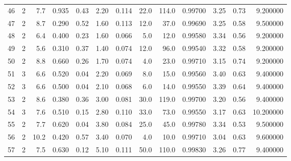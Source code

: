 \begin{tabular}{lrrrrrrrrrrrr}
46   &        2 &            7.7 &             0.935 &         0.43 &            2.20 &      0.114 &                 22.0 &                 114.0 &  0.99700 &  3.25 &       0.73 &   9.200000 \\
47   &        2 &            8.7 &             0.290 &         0.52 &            1.60 &      0.113 &                 12.0 &                  37.0 &  0.99690 &  3.25 &       0.58 &   9.500000 \\
48   &        2 &            6.4 &             0.400 &         0.23 &            1.60 &      0.066 &                  5.0 &                  12.0 &  0.99580 &  3.34 &       0.56 &   9.200000 \\
49   &        2 &            5.6 &             0.310 &         0.37 &            1.40 &      0.074 &                 12.0 &                  96.0 &  0.99540 &  3.32 &       0.58 &   9.200000 \\
50   &        2 &            8.8 &             0.660 &         0.26 &            1.70 &      0.074 &                  4.0 &                  23.0 &  0.99710 &  3.15 &       0.74 &   9.200000 \\
51   &        3 &            6.6 &             0.520 &         0.04 &            2.20 &      0.069 &                  8.0 &                  15.0 &  0.99560 &  3.40 &       0.63 &   9.400000 \\
52   &        3 &            6.6 &             0.500 &         0.04 &            2.10 &      0.068 &                  6.0 &                  14.0 &  0.99550 &  3.39 &       0.64 &   9.400000 \\
53   &        2 &            8.6 &             0.380 &         0.36 &            3.00 &      0.081 &                 30.0 &                 119.0 &  0.99700 &  3.20 &       0.56 &   9.400000 \\
54   &        3 &            7.6 &             0.510 &         0.15 &            2.80 &      0.110 &                 33.0 &                  73.0 &  0.99550 &  3.17 &       0.63 &  10.200000 \\
55   &        2 &            7.7 &             0.620 &         0.04 &            3.80 &      0.084 &                 25.0 &                  45.0 &  0.99780 &  3.34 &       0.53 &   9.500000 \\
56   &        2 &           10.2 &             0.420 &         0.57 &            3.40 &      0.070 &                  4.0 &                  10.0 &  0.99710 &  3.04 &       0.63 &   9.600000 \\
57   &        2 &            7.5 &             0.630 &         0.12 &            5.10 &      0.111 &                 50.0 &                 110.0 &  0.99830 &  3.26 &       0.77 &   9.400000 \\

\end{tabular}
